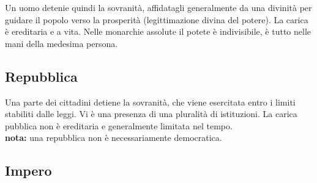 \documentclass[a4paper]{article}
\begin{document}
Un uomo detenie quindi la sovranità, affidatagli generalmente da una divinità
per guidare il popolo verso la prosperità (legittimazione divina del potere).
La carica è ereditaria e a vita.
Nelle monarchie assolute il potete è indivisibile, è tutto nelle mani
della medesima persona.

\subsection{Repubblica}


Una parte dei cittadini detiene la sovranità, che viene esercitata entro i limiti stabiliti dalle leggi.
Vi è una presenza di una pluralità di istituzioni.
La carica pubblica non è ereditaria e generalmente limitata nel tempo.\\
\textbf{\color{red}nota:} una repubblica non è necessariamente democratica.

\subsection{Impero}
\end{document}
